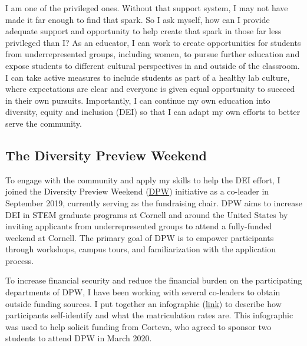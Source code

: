 \documentclass[11pt]{article}
\newcommand{\nicholas}[1]{{\color{nicholasCol} [\textbf{NS:} #1 (\today\ \currenttime)]}}
\newcommand{\amy}[1]{{\color{amyCol} [\textbf{Amy:} #1]}}
\begin{document}
I am one of the privileged ones. Without that support system, I may not have made it far enough to find that spark. So I ask myself, how can I provide adequate support and opportunity to help create that spark in those far less privileged than I? As an educator, I can work to create opportunities for students from underrepresented groups, including women, to pursue further education and expose students to different cultural perspectives in and outside of the classroom. I can take active measures to include students as part of a healthy lab culture, where expectations are clear and everyone is given equal opportunity to succeed in their own pursuits. Importantly, I can continue my own education into diversity, equity and inclusion (DEI) so that I can adapt my own efforts to better serve the community. %


\subsection*{The Diversity Preview Weekend}

To engage with the community and apply my skills to help the DEI effort, I joined the Diversity Preview Weekend (\href{https://cornelldpw.org}{DPW}) initiative as a co-leader in September 2019, currently serving as the fundraising chair. DPW aims to increase DEI in STEM graduate programs at Cornell and around the United States by inviting applicants from underrepresented groups to attend a fully-funded weekend at Cornell. The primary goal of DPW is to empower participants through workshops, campus tours, and familiarization with the application process. 

To increase financial security and reduce the financial burden on the participating departments of DPW, I have been working with several co-leaders to obtain outside funding sources. I put together an infographic (\href{https://github.com/nsantantonio/DPWinfographic/blob/master/infoGraphic.pdf}{link}) to describe how participants self-identify and what the matriculation rates are. This infographic was used to help solicit funding from Corteva, who agreed to sponsor two students to attend DPW in March 2020. %
\end{document}
